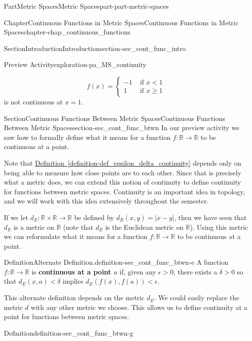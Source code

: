 \documentclass[oneside,10pt,]{book}
\newcommand{\xreffont}{\relax}
\newcommand{\terminology}[1]{\textbf{#1}}
\numberwithin{equation}{chapter}
\newcommand{\R}{\mathbb{R}}
\newcommand{\lt}{<}
\newcommand{\gt}{>}
\newcommand{\amp}{&}
\begin{document}
\begin{partptx}{Part}{Metric Spaces}{}{Metric Spaces}{}{}{part-part-metric-spaces}
\begin{chapterptx}{Chapter}{Continuous Functions in Metric Spaces}{}{Continuous Functions in Metric Spaces}{}{}{chapter-chap_continuous_functions}
\begin{sectionptx}{Section}{Introduction}{}{Introduction}{}{}{section-sec_cont_func_intro}
\begin{exploration}{Preview Activity}{}{exploration-pa_MS_continuity}
\begin{enumerate}[font=\bfseries,label=(\alph*),ref=\alph*]
\begin{enumerate}[font=\bfseries,label=(\roman*),ref=\theenumi.\roman*]
\begin{equation*}
f(x) = \begin{cases}-1 \amp \text{ if }  x \lt  1 \\ 1 \amp \text{ if }  x \geq 1 \end{cases}
\end{equation*}
is not continuous at \(x=1\).%
\end{enumerate}%
\end{enumerate}%
\end{exploration}%
%
\end{sectionptx}
%
%
\typeout{************************************************}
\typeout{************************************************}
%
\begin{sectionptx}{Section}{Continuous Functions Between Metric Spaces}{}{Continuous Functions Between Metric Spaces}{}{}{section-sec_cont_func_btwn}
In our preview activity we saw how to formally define what it means for a function \(f : \R \to \R\) to be continuous at a point.%
\par
Note that \hyperref[definition-def_epsilon_delta_continuity]{Definition~{\xreffont\ref{definition-def_epsilon_delta_continuity}}} depends only on being able to measure how close points are to each other. Since that is precisely what a metric does, we can extend this notion of continuity to define continuity for functions between metric spaces. Continuity is an important idea in topology, and we will work with this idea extensively throughout the semester.%
\par
If we let \(d_E : \R \times \R \to \R\) be defined by \(d_R(x,y) = | x - y |\), then we have seen that \(d_E\) is a metric on \(\R\) (note that \(d_E\) is the Euclidean metric on \(\R\)). Using this metric we can reformulate what it means for a function \(f : \R \to \R\) to be continuous at a point.%
\begin{definition}{Definition}{Alternate Definition.}{definition-sec_cont_func_btwn-e}%
A function \(f : \R \to \R\) is \terminology{continuous at a point \(a\)} if, given any \(\epsilon \gt 0\), there exists a \(\delta \gt 0\) so that \(d_E(x,a) \lt \delta\) implies \(d_E(f(x), f(a)) \lt \epsilon\).%
\end{definition}
This alternate definition depends on the metric \(d_E\). We could easily replace the metric \(d\) with any other metric we choose. This allows us to define continuity at a point for functions between metric spaces.%
\begin{definition}{Definition}{}{definition-sec_cont_func_btwn-g}%

\end{definition}
\end{sectionptx}
\end{chapterptx}
\end{partptx}
\end{document}
